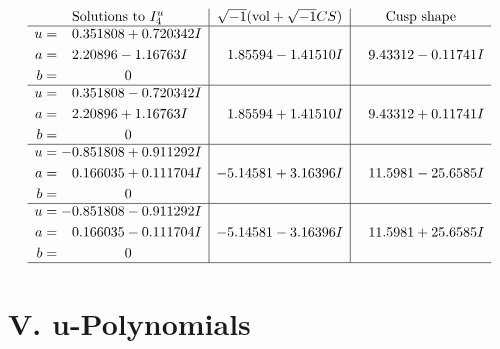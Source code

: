 \documentclass[1p]{elsarticle_modified}
\theoremstyle{definition}
\newcommand{\I}{\sqrt{-1}}
\begin{document}
$$\begin{array}{c|c|c}  
\text{Solutions to }I^u_{4}& \I (\text{vol} + \sqrt{-1}CS) & \text{Cusp shape}\\
 \hline 
\begin{aligned}
u &= \phantom{-}0.351808 + 0.720342 I \\
a &= \phantom{-}2.20896 - 1.16763 I \\
b &= \phantom{-0.000000 } 0\end{aligned}
 & \phantom{-}1.85594 - 1.41510 I & \phantom{-}9.43312 - 0.11741 I \\ \hline\begin{aligned}
u &= \phantom{-}0.351808 - 0.720342 I \\
a &= \phantom{-}2.20896 + 1.16763 I \\
b &= \phantom{-0.000000 } 0\end{aligned}
 & \phantom{-}1.85594 + 1.41510 I & \phantom{-}9.43312 + 0.11741 I \\ \hline\begin{aligned}
u &= -0.851808 + 0.911292 I \\
a &= \phantom{-}0.166035 + 0.111704 I \\
b &= \phantom{-0.000000 } 0\end{aligned}
 & -5.14581 + 3.16396 I & \phantom{-}11.5981 - 25.6585 I \\ \hline\begin{aligned}
u &= -0.851808 - 0.911292 I \\
a &= \phantom{-}0.166035 - 0.111704 I \\
b &= \phantom{-0.000000 } 0\end{aligned}
 & -5.14581 - 3.16396 I & \phantom{-}11.5981 + 25.6585 I\\
 \hline 
 \end{array}$$\newpage
\newpage\renewcommand{\arraystretch}{1}
\centering \section*{ V. u-Polynomials}
\end{document}
